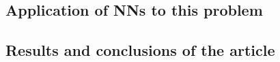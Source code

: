 \documentclass[12pt]{article}
\theoremstyle{plain}
\theoremstyle{definition}
\theoremstyle{definition}
\theoremstyle{definition}
\newtheorem*{solution}{Solución}
\begin{document}
\subsection*{Application of NNs to this problem}
\noindent 
\subsection*{Results and conclusions of the article}
\noindent


\newpage


\end{document}
